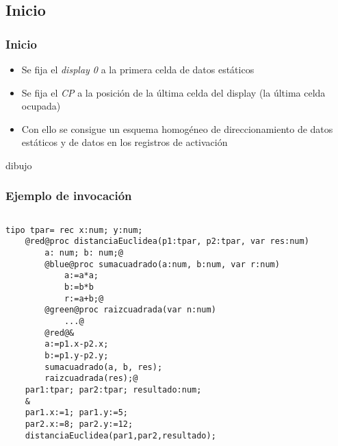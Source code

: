 \documentclass[hyperref={pdfpagelabels=false},tree-dvips]{beamer}
\begin{document}
\subsection{Inicio}
\begin{frame}[fragile]
\frametitle{Inicio}

\begin{itemize}[<+->]%
	\item Se fija el \emph{display 0} a la primera celda de datos estáticos
	\item Se fija el \emph{CP} a la posición de la última celda del display (la última celda ocupada)
	\item Con ello se consigue un esquema homogéneo de direccionamiento de datos estáticos y de datos en los registros de activación
\end{itemize}

dibujo

\end{frame}
\begin{frame}[fragile]
\frametitle{Ejemplo de invocación}

\begin{columns}[T]
\begin{lstlisting}[style=codigo]
	tipo tpar= rec x:num; y:num;
	@red@proc distanciaEuclidea(p1:tpar, p2:tpar, var res:num)
	    a: num; b: num;@
	    @blue@proc sumacuadrado(a:num, b:num, var r:num)
            a:=a*a;
	        b:=b*b
	        r:=a+b;@
	    @green@proc raizcuadrada(var n:num)
	        ...@
	    @red@&
	    a:=p1.x-p2.x;
	    b:=p1.y-p2.y;
	    sumacuadrado(a, b, res);
	    raizcuadrada(res);@
	par1:tpar; par2:tpar; resultado:num;
	&
	par1.x:=1; par1.y:=5;
	par2.x:=8; par2.y:=12;
	distanciaEuclidea(par1,par2,resultado);
\end{lstlisting}
\end{columns}

\end{frame}
\end{document}
